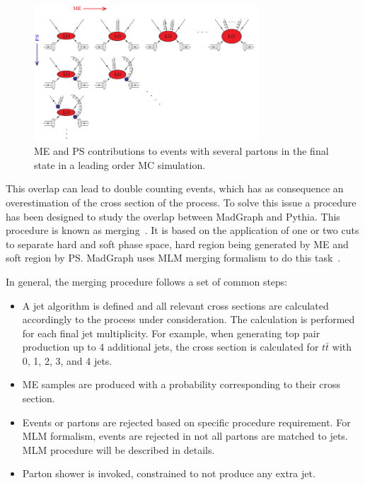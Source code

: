 \begin{figure}[!Hhtbp]
  \begin{center}
    \includegraphics[width=0.75\textwidth]{figs/PSMEInterface.png}
    \caption{ME and PS contributions to events with several partons in the final state in a leading order MC simulation.}
    \label{fig:PSME}
  \end{center}
\end{figure}

This overlap can lead to double counting events, which has as consequence an overestimation of the cross section of the process. To solve this issue a procedure has been designed to study the overlap between MadGraph and Pythia. This procedure is known as merging~\cite{Alwall:2007fs, Alwall:2008qv, Lavesson:2007uu}. It is based on the application of one or two cuts to separate hard and soft phase space, hard region being generated by ME and soft region by PS. MadGraph uses MLM merging formalism to do this task~\cite{Mangano:2001xp, Mangano:2006rw}. 

In general, the merging procedure follows a set of common steps:
\begin{itemize}
\item A jet algorithm is defined and all relevant cross sections are calculated accordingly to the process under consideration. The calculation is performed for each final jet multiplicity. For example, when generating top pair production up to 4 additional jets, the cross section is calculated for $t\bar{t}$ with 0, 1, 2, 3, and 4 jets. 
\item ME samples are produced with a probability corresponding to their cross section.
\item Events or partons are rejected based on specific procedure requirement. For MLM formalism, events are rejected in not all partons are matched to jets. MLM procedure will be described in details. 
\item Parton shower is invoked, constrained to not produce any extra jet.
\end{itemize}

